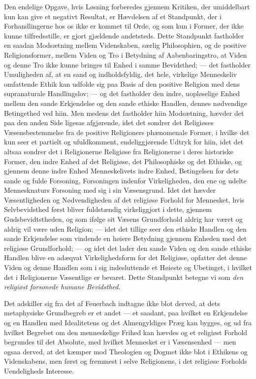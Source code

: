 \documentclass[12pt,a4paper]{article}
\begin{document}
Den endelige Opgave, hvis Løsning forberedes gjennem Kritiken, der
umiddelbart kun kan give et negativt Resultat, er Hævdelsen af et
Standpunkt, der i Forhandlingerne hos os ikke er kommet til Orde, og
som kun i Former, der ikke kunne tilfredsstille, er gjort gjældende
andetsteds. Dette Standpunkt fastholder en saadan Modsætning mellem
Videnskaben, særlig Philosophien, og de positive Religionsformer,
mellem Viden og Tro i Betydning af Aabenbaringstro, at Viden og denne
Tro ikke kunne bringes til Enhed i samme Bevidsthed; --- det fastholder
Umuligheden af, at en sand og indholdsfyldig, det hele, virkelige
Menneskeliv omfattende Ethik kan udfolde sig paa Basis af den positive
Religion med dens supranaturale Handlingslov; --- og det fastholder den
indre, uopløselige Enhed mellem den sande Erkjendelse og den sande
ethiske Handlen, dennes nødvendige Betingethed ved hiin. Men medens
det fastholder hiin Modsætning, hævder det paa den anden Side ligesas
afgjørende, idet det sondrer det Religiøses Væsensbestemmelse fra de
positive Religioners phænomenale Former, i hvilke det kun seer et
partielt og ufuldkomment, endeliggjørende Udtryk for hiin, idet det
altsaa sondrer det i Religionerne Religiøse fra Religionerne i deres
historiske Former, den indre Enhed af det Religiøse, det Philosophiske
og det Ethiske, og gjennem denne indre Enhed Menneskelivets indre
Enhed, Betingelsen for dets sande og fulde Forsoning, Forsoningen
indenfor Virkeligheden, den ene og udelte Mennesknaturs Forsoning med
sig i sin Væsensgrund. Idet det hævder Væsentligheden og
Nødvendigheden af det religiøse Forhold for Mennesket, hvis
Selvbevidsthed først bliver fuldstændig virkeliggjort i dette, gjennem
Gudsbevidtstheden, og som ifølge sit Væsens Grundforhold aldrig har
været og aldrig vil være uden Religion; --- idet det tillige seer den
ethiske Handlen og den sande Erkjendelse som vindende en høiere
Betydning gjennem Enheden med det religiøse Grundforhold; --- og idet
det lader den sande Viden og den sande ethiske Handlen blive en
adæqvat Virkelighedsform for det Religiøse, opfatter det denne Viden
og denne Handlen som i sig indesluttende et Høieste og Ubetinget, i
hvilket det i Religionerne Væsentlige er bevaret. Dette Standpunkt
betegne vi som \textit{den religiøst forsonede humane Bevidsthed}.

Det adskiller sig fra det af Feuerbach indtagne ikke blot derved, at
dets metaphysiske Grundbegreb er et andet --- et saadant, paa hvilket
en Erkjendelse og en Handlen med Idealitetens og det Almengyldiges
Præg kan bygges, og ud fra hvilket Begrebet om den menneskelige Frihed
kan hævdes og et religiøst Forhold begrundes til det Absolute, med
hvilket Mennesket er i Væsensenhed --- men ogsaa derved, at det
kæmper mod Theologien og Dogmet ikke blot i Ethikens og Videnskabens,
men først og fremmest i selve Religionens, i det religiøse Forholds
Uendeligheds Interesse.
\end{document}
